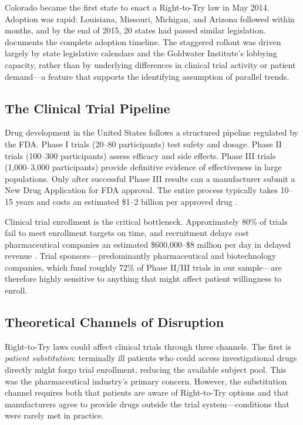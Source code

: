 \documentclass[12pt]{article}
\begin{document}
Colorado became the first state to enact a Right-to-Try law in May 2014. Adoption was rapid: Louisiana, Missouri, Michigan, and Arizona followed within months, and by the end of 2015, 20 states had passed similar legislation.  documents the complete adoption timeline. The staggered rollout was driven largely by state legislative calendars and the Goldwater Institute's lobbying capacity, rather than by underlying differences in clinical trial activity or patient demand---a feature that supports the identifying assumption of parallel trends.

\subsection{The Clinical Trial Pipeline}

Drug development in the United States follows a structured pipeline regulated by the FDA. Phase I trials (20--80 participants) test safety and dosage. Phase II trials (100--300 participants) assess efficacy and side effects. Phase III trials (1,000--3,000 participants) provide definitive evidence of effectiveness in large populations. Only after successful Phase III results can a manufacturer submit a New Drug Application for FDA approval. The entire process typically takes 10--15 years and costs an estimated \$1--2 billion per approved drug \citep{dimasi2016innovation}.

Clinical trial enrollment is the critical bottleneck. Approximately 80\% of trials fail to meet enrollment targets on time, and recruitment delays cost pharmaceutical companies an estimated \$600,000--\$8 million per day in delayed revenue \citep{getz2008global}. Trial sponsors---predominantly pharmaceutical and biotechnology companies, which fund roughly 72\% of Phase II/III trials in our sample---are therefore highly sensitive to anything that might affect patient willingness to enroll.

\subsection{Theoretical Channels of Disruption}

Right-to-Try laws could affect clinical trials through three channels. The first is \textit{patient substitution}: terminally ill patients who could access investigational drugs directly might forgo trial enrollment, reducing the available subject pool. This was the pharmaceutical industry's primary concern. However, the substitution channel requires both that patients are aware of Right-to-Try options and that manufacturers agree to provide drugs outside the trial system---conditions that were rarely met in practice.
\end{document}
